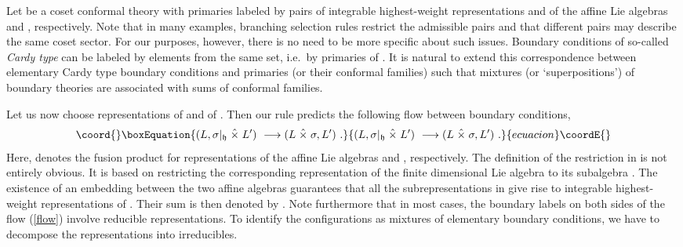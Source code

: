 \documentclass[a4paper,prd,twocolumn,nobibnotes,amssymb,preprintnumbers]{revtex4}
\begin{document}
Let \coordHE{} be a coset conformal theory with primaries labeled 
by pairs \coordHE{} of integrable highest-weight representations 
\coordHE{} and \coordHE{} of the affine Lie algebras \coordHE{} and 
\coordHE{}, respectively. Note that in many examples, 
branching selection rules restrict the admissible pairs and 
that different pairs may describe the same coset sector. 
For our purposes, however, there is no need to be more specific 
about such issues. Boundary conditions \coordHE{} of so-called {\em 
Cardy type} \cite{Cardy:1989ir} can be labeled by elements 
from the same set, i.e.\ by primaries of \coordHE{}. It is natural 
to extend this correspondence between elementary Cardy type 
boundary conditions and primaries (or their conformal 
families) such that mixtures (or `superpositions') of 
boundary theories are associated with sums of 
conformal families.  

Let us now choose representations \coordHE{} of \coordHE{} and 
\coordHE{} of \coordHE{}. Then our rule predicts the following flow 
between boundary conditions, 
\begin{equation}\coord{}\boxEquation{\label{flow}
(L,\sigma |_{\mathfrak{h}}\; \hat{\times}\;  L')\ \longrightarrow (L \; 
\hat{\times} \; \sigma,L')\ .
}{(L,\sigma |_{\mathfrak{h}}\; \hat{\times}\;  L')\ \longrightarrow (L \; 
\hat{\times} \; \sigma,L')\ .
}{ecuacion}\coordE{}\end{equation}
Here, \myHighlight{$\hat{\times} $}\coordHE{} denotes the fusion product for representations of 
the affine Lie algebras \coordHE{} and \coordHE{}, respectively. 
The definition of the restriction in \coordHE{} is not entirely 
obvious. It is based on restricting the corresponding representation 
\coordHE{} of the finite dimensional Lie algebra \coordHE{} to its 
subalgebra \coordHE{}. The existence of an embedding between the two 
affine algebras guarantees that all the subrepresentations in 
\coordHE{} give rise to integrable highest-weight 
representations of \coordHE{}. Their sum is then denoted 
by \coordHE{}. Note furthermore that in most cases, the 
boundary labels on both sides of the flow (\ref{flow}) involve 
reducible representations. To identify the configurations as 
mixtures of elementary boundary conditions, we have to decompose 
the representations into irreducibles.
\end{document}
